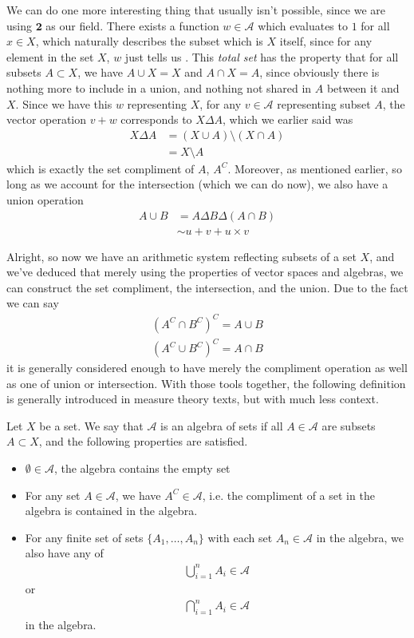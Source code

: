 \documentclass[11pt]{article}
\begin{document}
We can do one more interesting thing that usually isn't possible, since we are using $\mathbf{2}$ as our field. There exists a function $w \in \mathcal A$ which evaluates to $1$ for all $x \in X$, which naturally describes the subset which is $X$ itself, since for any element in the set $X$, $w$ just tells us . This \emph{total set} has the property that for all subsets $A \subset X$, we have $A \cup X = X$ and $A \cap X = A$, since obviously there is nothing more to include in a union, and nothing not shared in $A$ between it and $X$. Since we have this $w$ representing $X$, for any $v \in \mathcal A$ representing subset $A$, the vector operation $v + w$ corresponds to $X \Delta A$, which we earlier said was \begin{align*}
X \Delta A &= (X \cup A) \setminus (X \cap A) \\
&= X \setminus A
\end{align*}
which is exactly the set compliment of $A$, $A^C$. Moreover, as mentioned earlier, so long as we account for the intersection (which we can do now), we also have a union operation \begin{align*}
A \cup B &= A \Delta B \Delta (A \cap B) \\
& \sim u + v + u \times v
\end{align*}

Alright, so now we have an arithmetic system reflecting subsets of a set $X$, and we've deduced that merely using the properties of vector spaces and algebras, we can construct the set compliment, the intersection, and the union. Due to the fact we can say \begin{gather*}
(A^C \cap B^C)^C = A \cup B \\
(A^C \cup B^C)^C = A \cap B 
\end{gather*}
it is generally considered enough to have merely the compliment operation as well as one of union or intersection. With those tools together, the following definition is generally introduced in measure theory texts, but with much less context. \begin{definition}
Let $X$ be a set. We say that $\mathcal A$ is an algebra of sets if all $A \in \mathcal A$ are subsets $A \subset X$, and the following properties are satisfied. \begin{itemize}
\item $\emptyset \in \mathcal A$, the algebra contains the empty set
\item For any set $A \in \mathcal A$, we have $A^C \in \mathcal A$, i.e. the compliment of a set in the algebra is contained in the algebra.
\item For any finite set of sets $\{A_1, \dots, A_n\}$ with each set $A_n \in \mathcal A$ in the algebra, we also have any of \begin{gather*}
\bigcup_{i=1}^n A_i \in \mathcal A
\end{gather*}
or \begin{gather*}
\bigcap_{i=1}^n A_i \in \mathcal A
\end{gather*}
in the algebra.
\end{itemize}
\end{definition}
\end{document}
